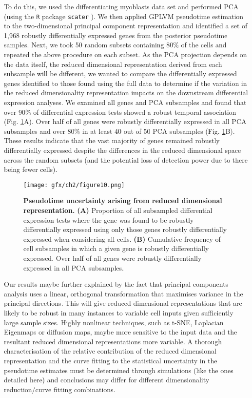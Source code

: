 To do this, we used the differentiating myoblasts data set \cite{Trapnell2014} and performed PCA (using the \texttt{R} package \texttt{scater} \cite{scater}). We then applied GPLVM pseudotime estimation to the two-dimensional principal component representation and identified a set of 1,968 robustly differentially expressed genes from the posterior pseudotime samples. Next, we took 50 random subsets containing 80\% of the cells and repeated the above procedure on each subset. As the PCA projection depends on the data itself, the reduced dimensional representation derived from each subsample will be different, we wanted to compare the differentially expressed genes identified to those found using the full data to determine if the variation in the reduced dimensionality representation impacts on the downstream differential expression analyses. We examined all genes and PCA subsamples and found that over 90\% of differential expression tests showed a robust temporal association (Fig. \ref{fig:pca_compare}A). Over half of all genes were robustly differentially expressed in all PCA subsamples and over 80\% in at least 40 out of 50 PCA subsamples (Fig. \ref{fig:pca_compare}B). These results indicate that the vast majority of genes remained robustly differentially expressed despite the differences in the reduced dimensional space across the random subsets (and the potential loss of detection power due to there being fewer cells).

\begin{figure}
\centering
	\texttt{[image: gfx/ch2/figure10.png]}
\caption{ {\bf Pseudotime uncertainty arising from reduced dimensional representation.}
\textbf{(A)} Proportion of all subsampled differential expression tests where the gene was found to be robustly differentially expressed using only those genes robustly differentially expressed when considering all cells. %
\textbf{(B)} Cumulative frequency of cell subsamples in which a given gene is robustly differentially expressed. Over half of all genes were robustly differentially expressed in all PCA subsamples.} \label{fig:pca_compare}
\end{figure}

Our results maybe further explained by the fact that principal components analysis uses a linear, orthogonal transformation that maximises variance in the principal directions. This will give reduced dimensional representations that are likely to be robust in many instances to variable cell inputs given sufficiently large sample sizes. Highly nonlinear techniques, such as t-SNE, Laplacian Eigenmaps or diffusion maps, maybe more sensitive to the input data and the resultant reduced dimensional representations more variable. A thorough characterisation of the relative contribution of the reduced dimensional representation and the curve fitting to the statistical uncertainty in the pseudotime estimates must be determined through simulations (like the ones detailed here) and conclusions may differ for different dimensionality reduction/curve fitting combinations.

